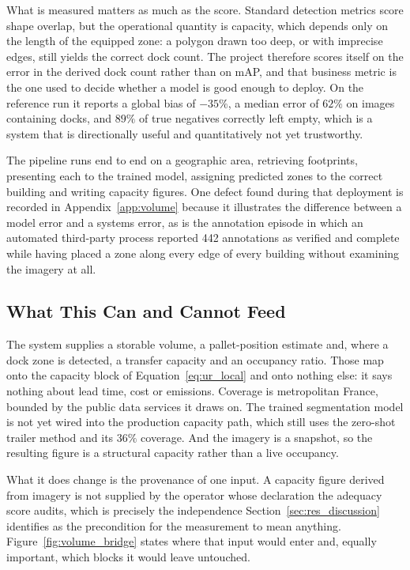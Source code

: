 What is measured matters as much as the score. Standard detection metrics score shape
overlap, but the operational quantity is capacity, which depends only on the length of the
equipped zone: a polygon drawn too deep, or with imprecise edges, still yields the correct
dock count. The project therefore scores itself on the error in the derived dock count rather
than on mAP, and that business metric is the one used to decide whether a model is good
enough to deploy. On the reference run it reports a global bias of $-35\%$, a median error of
$62\%$ on images containing docks, and $89\%$ of true negatives correctly left empty, which
is a system that is directionally useful and quantitatively not yet trustworthy.

The pipeline runs end to end on a geographic area, retrieving footprints, presenting each to
the trained model, assigning predicted zones to the correct building and writing capacity
figures. One defect found during that deployment is recorded in Appendix~\ref{app:volume}
because it illustrates the difference between a model error and a systems error, as is the
annotation episode in which an automated third-party process reported 442 annotations as
verified and complete while having placed a zone along every edge of every building without
examining the imagery at all.

\subsection{What This Can and Cannot Feed}
\label{sec:res_volume_bridge}

The system supplies a storable volume, a pallet-position estimate and, where a dock zone is
detected, a transfer capacity and an occupancy ratio. Those map onto the capacity block of
Equation~\ref{eq:ur_local} and onto nothing else: it says nothing about lead time, cost or
emissions. Coverage is metropolitan France, bounded by the public data services it draws on.
The trained segmentation model is not yet wired into the production capacity path, which
still uses the zero-shot trailer method and its $36\%$ coverage. And the imagery is a
snapshot, so the resulting figure is a structural capacity rather than a live occupancy.

What it does change is the provenance of one input. A capacity figure derived from imagery is
not supplied by the operator whose declaration the adequacy score audits, which is precisely
the independence Section~\ref{sec:res_discussion} identifies as the precondition for the
measurement to mean anything. Figure~\ref{fig:volume_bridge} states where that input would
enter and, equally important, which blocks it would leave untouched.

